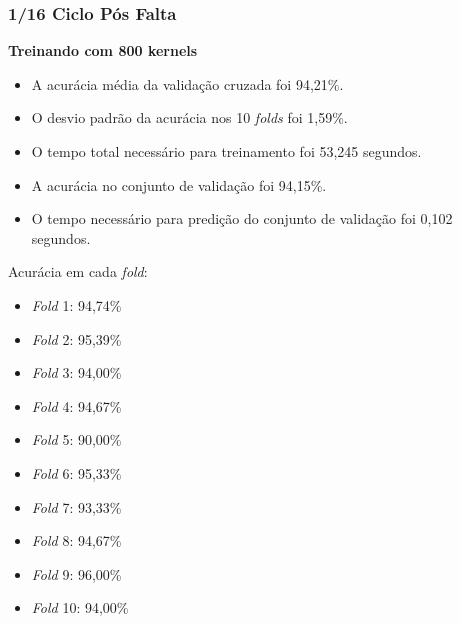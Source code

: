 \subsubsection{1/16 Ciclo Pós Falta}
\textbf{Treinando com 800 kernels}
\begin{itemize}
    \item A acurácia média da validação cruzada foi 94,21\%.
    \item O desvio padrão da acurácia nos 10 \textit{folds} foi 1,59\%.
    \item O tempo total necessário para treinamento foi 53,245 segundos.
    \item A acurácia no conjunto de validação foi 94,15\%.
    \item O tempo necessário para predição do conjunto de validação foi 0,102 segundos.
\end{itemize}
Acurácia em cada \textit{fold}:
\begin{itemize}
    \item \textit{Fold} 1: 94,74\%
    \item \textit{Fold} 2: 95,39\%
    \item \textit{Fold} 3: 94,00\%
    \item \textit{Fold} 4: 94,67\%
    \item \textit{Fold} 5: 90,00\%
    \item \textit{Fold} 6: 95,33\%
    \item \textit{Fold} 7: 93,33\%
    \item \textit{Fold} 8: 94,67\%
    \item \textit{Fold} 9: 96,00\%
    \item \textit{Fold} 10: 94,00\%
\end{itemize}

